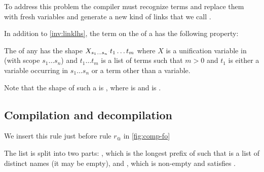 To address this problem the compiler must recognize
\notllambda terms
and replace them
with fresh variables and generate a new kind of links
that we call \linkbeta.

In addition to \cref{inv:linklhs}, the term on the \rhs of a \linkbeta
has the following property:

\newcommand{\rhsBetaHead}{\ensuremath{X_{s_1\dots s_n}}}
\newcommand{\rhsBeta}{\ensuremath{\rhsBetaHead\appsep t_1\dots t_m}\xspace}

\begin{invariant}[\linkbeta \rhs] \label{inv:beta-rhs}
  The \rhs of any \linkbeta has the shape $X_{s_1\ldots s_n}\appsep t_1\dots t_m$
  where $X$ is a unification variable in \llambda (with scope $s_1\dots s_n$)
  and $t_1\dots t_m$ is a list of terms such that $m>0$ and
  $t_1$ is either a variable occurring in $s_1\dots s_n$ or
  a term other than a variable.
\end{invariant}

\noindent Note that the shape of such a \rhs is
  \eI{~\mapp~ [~\muva~ X S | L]}, where
   is \eI{[s~$_1$~, ~$\ldots$~, s~$_n$~]}
  and  is  \eI{[t~$_1$~, ~$\ldots$~, t~$_m$~]}.
  




\subsection{Compilation and decompilation}

We insert this rule
just before rule $r_@$ in \cref{fig:comp-fo}



\noindent
The list  is split into two parts: , which is the
longest prefix of  such that  is a list of distinct
names (it may be empty), and , which is non-empty and
satisfies .

